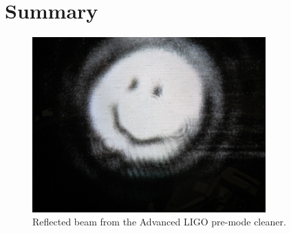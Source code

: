 \chapter{Summary}

\begin{figure}
\begin{centering}
\includegraphics[width=0.8\textwidth]{figures/PMCRefl_smiley.JPG}
\caption{Reflected beam from the Advanced LIGO pre-mode cleaner.}
\label{fig:smiley}
\end{centering}
\end{figure}